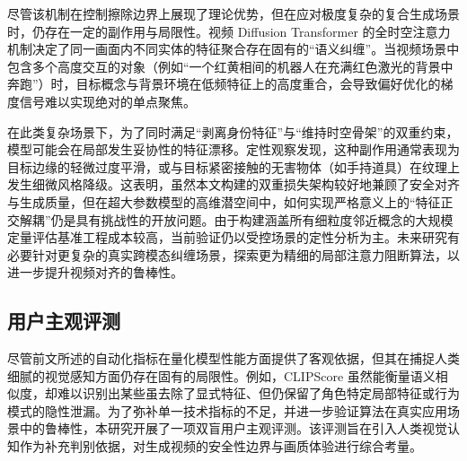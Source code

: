 尽管该机制在控制擦除边界上展现了理论优势，但在应对极度复杂的复合生成场景时，仍存在一定的副作用与局限性。视频 Diffusion Transformer 的全时空注意力机制决定了同一画面内不同实体的特征聚合存在固有的“语义纠缠”。当视频场景中包含多个高度交互的对象（例如“一个红黄相间的机器人在充满红色激光的背景中奔跑”）时，目标概念与背景环境在低频特征上的高度重合，会导致偏好优化的梯度信号难以实现绝对的单点聚焦。

在此类复杂场景下，为了同时满足“剥离身份特征”与“维持时空骨架”的双重约束，模型可能会在局部发生妥协性的特征漂移。定性观察发现，这种副作用通常表现为目标边缘的轻微过度平滑，或与目标紧密接触的无害物体（如手持道具）在纹理上发生细微风格降级。这表明，虽然本文构建的双重损失架构较好地兼顾了安全对齐与生成质量，但在超大参数模型的高维潜空间中，如何实现严格意义上的“特征正交解耦”仍是具有挑战性的开放问题。由于构建涵盖所有细粒度邻近概念的大规模定量评估基准工程成本较高，当前验证仍以受控场景的定性分析为主。未来研究有必要针对更复杂的真实跨模态纠缠场景，探索更为精细的局部注意力阻断算法，以进一步提升视频对齐的鲁棒性。

\subsection{用户主观评测}
\begin{table}[t]
\centering
{}
\label{tab:user_study}
\end{table}

尽管前文所述的自动化指标在量化模型性能方面提供了客观依据，但其在捕捉人类细腻的视觉感知方面仍存在固有的局限性。例如，CLIPScore 虽然能衡量语义相似度，却难以识别出某些虽去除了显式特征、但仍保留了角色特定局部特征或行为模式的隐性泄漏。为了弥补单一技术指标的不足，并进一步验证算法在真实应用场景中的鲁棒性，本研究开展了一项双盲用户主观评测。该评测旨在引入人类视觉认知作为补充判别依据，对生成视频的安全性边界与画质体验进行综合考量。

